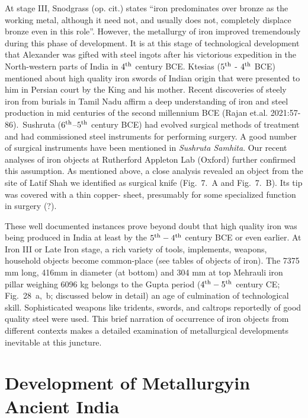 At stage III, Snodgrass (op. cit.) states “iron predominates over bronze as the working metal, although it need not, and usually does not, completely displace bronze even in this role”. However, the metallurgy of iron improved tremendously during this phase of development. It is at this stage of technological development that Alexander was gifted with steel ingots after his victorious expedition in the North-western parts of India in $4^{\rm th}$ century BCE. Ktesias ($5^{\rm th}$ - $4^{\rm th}$ BCE) mentioned about high quality iron swords of Indian origin that were presented to him in Persian court by the King and his mother. Recent discoveries of steely iron from burials in Tamil Nadu affirm a deep understanding of iron and steel production in mid centuries of the second millennium BCE (Rajan et.al. 2021:57-86).~Sushruta ($6^{\rm th}$–$5^{\rm th}$ century BCE) had evolved surgical methods of treatment and had commissioned steel instruments for performing surgery. A good number of surgical instruments have been mentioned in {\it Sushruta Samhita}. Our recent analyses of iron objects at Rutherford Appleton Lab (Oxford) further confirmed this assumption. As mentioned above, a close analysis revealed an object from the site of Latif Shah we identified as surgical knife (Fig.~7.~A and Fig.~7.~B). Its tip was covered with a thin copper- sheet, presumably for some specialized function in surgery (?). 

These well documented instances prove beyond doubt that high quality iron was being produced in India at least by the $5^{\rm th} - 4^{\rm th}$ century BCE or even earlier. At Iron III or Late Iron stage, a rich variety of tools, implements, weapons, household objects become common-place (see tables of objects of iron). The 7375 mm long, 416mm in diameter (at bottom) and 304 mm at top Mehrauli iron pillar weighing 6096 kg belongs to the Gupta period ($4^{\rm th}-5^{\rm th}$ century CE; Fig.~28~a,~b; discussed below in detail) an age of culmination of technological skill. Sophisticated weapons like tridents, swords, and caltrops reportedly of good quality steel were used. This brief narration of occurrence of iron objects from different contexts makes a detailed examination of metallurgical developments inevitable at this juncture.

\vspace{-.3cm}

\section*{Development of Metallurgy\hfill \break in Ancient India}\label{section-1}

